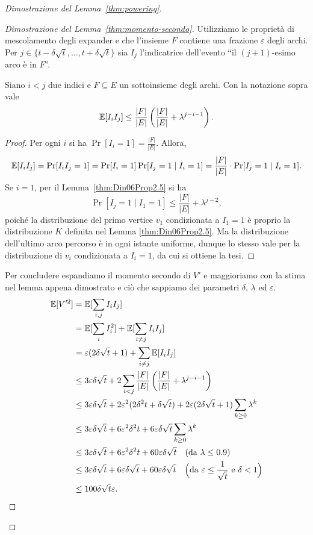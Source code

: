 \begin{proof}[Dimostrazione del Lemma~\ref{thm:powering}]
\begin{proof}[Dimostrazione del Lemma~\ref{thm:momento-secondo}]
		Utilizziamo le proprietà di mescolamento degli expander e che l'insieme
		$F$ contiene una frazione $\varepsilon$ degli archi.
		Per $j \in \{ t - \delta \sqrt{t}, \ldots, t + \delta
		\sqrt{t} \}$ sia $I_j$ l'indicatrice dell'evento ``il $(j + 1)$-esimo arco
		è in $F$''.

		\begin{lemma} \label{thm:Din06Prop6.5}
			Siano $i < j$ due indici e $F \subseteq E$ un sottoinsieme degli archi.
			Con la notazione sopra vale
			\[
				\mathbb{E}[I_i I_j] \le \frac{|F|}{|E|} \left( \frac{|F|}{|E|} +
					\lambda^{j - i - 1} \right).
			\]
		\end{lemma}
		\begin{proof}
			Per ogni $i$ si ha $\Pr[I_i = 1] = \frac{|F|}{|E|}$.
			Allora,
			\[
				\mathbb{E}[I_i I_j] = \Pr[I_i I_j = 1] = \Pr[I_i = 1]\Pr[I_j = 1 \mid I_i = 1]
				= \frac{|F|}{|E|} \cdot \Pr[I_j = 1 \mid I_i = 1].
			\]
			Se $i = 1$, per il Lemma~\ref{thm:Din06Prop2.5} si ha
			\[
				\Pr[I_j = 1 \mid I_1 = 1]
				\le \frac{|F|}{|E|} + \lambda^{j - 2},
			\]
			poiché la distribuzione del primo vertice $v_1$ condizionata a
			$I_1 = 1$ è proprio la distribuzione $K$ definita nel Lemma
			\ref{thm:Din06Prop2.5}.
			Ma la distribuzione dell'ultimo arco percorso è in ogni
			istante uniforme, dunque lo stesso vale per la distribuzione di
			$v_i$ condizionata a $I_i = 1$, da cui si ottiene la tesi.
		\end{proof}

		Per concludere espandiamo il momento secondo di $V'$ e maggioriamo
		con la stima nel lemma appena dimostrato e ciò che sappiamo dei
		parametri $\delta$, $\lambda$ ed $\varepsilon$.
		\begin{align*}
			\mathbb{E}[V'^2] &= \mathbb{E}[ \sum_{i, j} I_i I_j ] \\
			&= \mathbb{E}[ \sum_{i} I_i^2 ] + \mathbb{E}[ \sum_{i \neq j} I_i I_j ] \\
			&= \varepsilon (2 \delta \sqrt{t} + 1) + \sum_{i \neq j} \mathbb{E}[ I_i I_j ] \\ 
			&\le 3  \varepsilon \delta \sqrt{t} + 2 \sum_{i < j}
				\frac{|F|}{|E|} \left( \frac{|F|}{|E|} + \lambda^{j - i - 1} \right) \\
			&\le 3 \varepsilon \delta \sqrt{t} +
				2 \varepsilon^2 (2 \delta^2 t + \delta \sqrt{t}) +
				2 \varepsilon (2 \delta \sqrt{t} + 1) \sum_{k \geq 0} \lambda^k \\
			&\le 3 \varepsilon \delta \sqrt{t} +
				6 \varepsilon^2 \delta^2 t +
				6 \varepsilon \delta \sqrt{t} \sum_{k \geq 0} \lambda^k \\
			&\le 3 \varepsilon \delta \sqrt{t} +
				6 \varepsilon^2 \delta^2 t +
				60 \varepsilon \delta \sqrt{t} \quad (\text{da } \lambda \le 0.9) \\
			&\le 3 \varepsilon \delta \sqrt{t} + 6 \varepsilon \delta \sqrt{t} +
				60 \varepsilon \delta \sqrt{t} \quad \Bigl(\text{da }
				\varepsilon \le \frac1{\sqrt{t}} \text{ e } \delta < 1\Bigr) \\
			&\le 100 \delta \sqrt{t} \varepsilon.
	\end{align*}
	\end{proof}


\end{proof}
